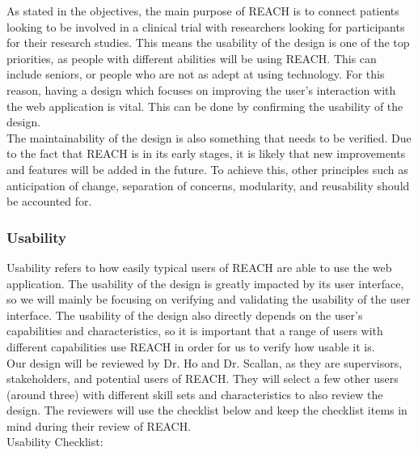 \documentclass[12pt, titlepage]{article}
\begin{document}
As stated in the objectives, the main purpose of REACH is to connect patients looking to be 
involved in a clinical trial with researchers looking for participants for their research studies. 
This means the usability of the design is one of the top priorities, as people with different 
abilities will be using REACH. This can include seniors, or people who are not as adept at using 
technology. For this reason, having a design which focuses on improving the user's interaction 
with the web application is vital. This can be done by confirming the usability of the design.\\

The maintainability of the design is also something that needs to be verified. Due to the fact 
that REACH is in its early stages, it is likely that new improvements and features will be added 
in the future. To achieve this, other principles such as anticipation of change, separation of 
concerns, modularity, and reusability should be accounted for.

\subsubsection{Usability}

Usability refers to how easily typical users of REACH are able to use the web application. The 
usability of the design is greatly impacted by its user interface, so we will mainly be focusing 
on verifying and validating the usability of the user interface. The usability of the design also 
directly depends on the user's capabilities and characteristics, so it is important that a range 
of users with different capabilities use REACH in order for us to verify how usable it is.\\

Our design will be reviewed by Dr. Ho and Dr. Scallan, as they are supervisors, stakeholders, and 
potential users of REACH. They will select a few other users (around three) with different 
skill sets and characteristics to also review the design. The reviewers will use the checklist 
below and keep the checklist items in mind during their review of REACH.\\

\noindent Usability Checklist:
\end{document}
